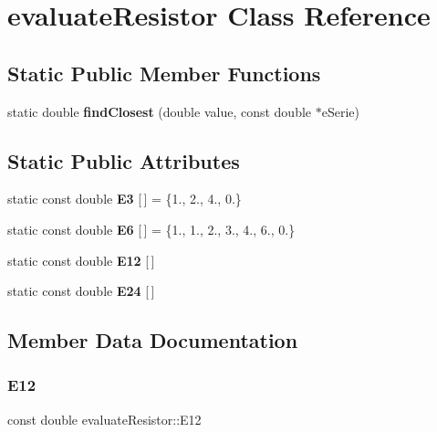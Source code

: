 \hypertarget{classevaluateResistor}{}\section{evaluate\+Resistor Class Reference}
\label{classevaluateResistor}
\subsection*{Static Public Member Functions}
\begin{DoxyCompactItemize}
\item 
\mbox{\label{classevaluateResistor_a0d434e47b94ce646cbcd10e6f1f2e084}} 
static double {\bfseries find\+Closest} (double value, const double $\ast$e\+Serie)
\end{DoxyCompactItemize}
\subsection*{Static Public Attributes}
\begin{DoxyCompactItemize}
\item 
\mbox{\label{classevaluateResistor_af5e266c489d3034f4077ca44f59a6c1d}} 
static const double {\bfseries E3} \mbox{[}$\,$\mbox{]} = \{1., 2., 4., 0.\}
\item 
\mbox{\label{classevaluateResistor_a4740a0fe56c3bee3a254f3f2cb041e81}} 
static const double {\bfseries E6} \mbox{[}$\,$\mbox{]} = \{1., 1., 2., 3., 4., 6., 0.\}
\item 
static const double {\bfseries E12} \mbox{[}$\,$\mbox{]}
\item 
static const double {\bfseries E24} \mbox{[}$\,$\mbox{]}
\end{DoxyCompactItemize}


\subsection{Member Data Documentation}
\mbox{\label{classevaluateResistor_a4ad1d14208c52720ebded7accf2ed219}} 
\subsubsection{\texorpdfstring{E12}{E12}}
{\footnotesize\ttfamily const double evaluate\+Resistor\+::\+E12\hspace{0.3cm}{\ttfamily [static]}}

